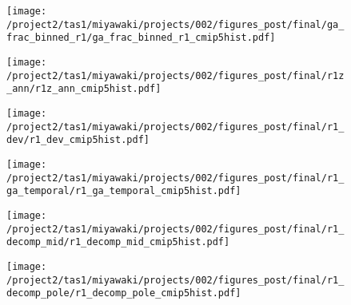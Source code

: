 \documentclass{ametsocV5}
\begin{document}

\begin{figure}[t]
  \noindent\texttt{[image: /project2/tas1/miyawaki/projects/002/figures\_post/final/ga\_frac\_binned\_r1/ga\_frac\_binned\_r1\_cmip5hist.pdf]}\\
  \label{fig:cmip5-binned-r1}
\end{figure}

\begin{figure}[t]
  \noindent\texttt{[image: /project2/tas1/miyawaki/projects/002/figures\_post/final/r1z\_ann/r1z\_ann\_cmip5hist.pdf]}\\
  \label{fig:cmip5hist-r1-ann}
\end{figure}

\begin{figure}[t]
  \centering
  \noindent\texttt{[image: /project2/tas1/miyawaki/projects/002/figures\_post/final/r1\_dev/r1\_dev\_cmip5hist.pdf]}\\
  \label{fig:cmip5hist-r1-dev}
\end{figure}

\begin{figure}[t]
  \noindent\texttt{[image: /project2/tas1/miyawaki/projects/002/figures\_post/final/r1\_ga\_temporal/r1\_ga\_temporal\_cmip5hist.pdf]}\\
  \label{fig:cmip5hist-r1-ga-temporal}
\end{figure}

\begin{figure}[t]
  \noindent\texttt{[image: /project2/tas1/miyawaki/projects/002/figures\_post/final/r1\_decomp\_mid/r1\_decomp\_mid\_cmip5hist.pdf]}\\
  \label{fig:cmip5hist-r1-decomp-mid}
\end{figure}

\begin{figure}[t]
  \noindent\texttt{[image: /project2/tas1/miyawaki/projects/002/figures\_post/final/r1\_decomp\_pole/r1\_decomp\_pole\_cmip5hist.pdf]}\\
  \label{fig:cmip5hist-r1-decomp-pole}
\end{figure}
\end{document}
